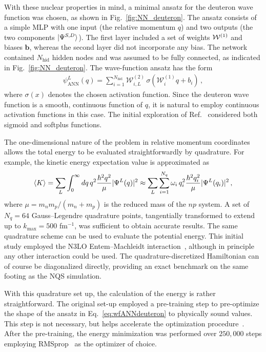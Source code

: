 With these nuclear properties in mind, a minimal ansatz for the deuteron wave function was chosen, as shown in Fig.~\ref{fig:NN_deuteron}. The ansatz consists of a simple MLP with one input (the relative momentum $q$) and two outputs (the two components $\ket{\Psi^{S,D}}$). The first layer included a set of weights ${\bf \mathcal{W}}^{(1)}$ and biases $\mathbf{b}$, whereas the second layer did not incorporate any bias. The network contained $N_\text{hid}$ hidden nodes and was assumed to be fully connected, as indicated in Fig.~\ref{fig:NN_deuteron}. The wave-function ansatz has the form
\begin{align}
    \psi_{\textrm{ANN}}^L (q) =  \sum_{i=1}^{N_\text{hid}} \mathcal{W}^{(2)}_{i,L} \, \sigma \left( \mathcal{W}^{(1)}_{i} q + b_{i} \right) \, ,
    \label{eq:wfANNdeuteron}
\end{align}
where $\sigma(x)$ denotes the chosen activation function. Since the deuteron wave function is a smooth, continuous function of $q$, it is natural to employ continuous activation functions in this case. The initial exploration of Ref.~\cite{keeble_machine_2020} considered both sigmoid and softplus functions.
 


The one-dimensional nature of the problem in relative momentum coordinates allows the total energy to be evaluated straightforwardly by quadrature. For example, the kinetic energy expectation value is approximated as
\begin{align}
    \braket{K} = \sum_L 
    \int_0^\infty dq \, q^2 
    \frac{\hbar^2 q^2}{\mu} | \Psi^L(q) |^2
    \approx 
    \sum_L \sum_{i=1}^{N_q} \omega_i \, q_i^2 
    \frac{\hbar^2 q_i^2}{\mu} | \Psi^L(q_i) |^2 \, ,
    \label{eq:kinetic}
\end{align}
where $\mu = m_n m_p /(m_n + m_p)$ is the reduced mass of the $np$ system. 
A set of $N_q = 64$ Gauss--Legendre quadrature points, tangentially transformed to extend up to $k_\textrm{max} = 500$ fm$^{-1}$, was sufficient to obtain accurate results. The same quadrature scheme can be used to evaluate the potential energy.
This initial study employed the N3LO Entem--Machleidt interaction~\cite{Entem2003}, although in principle any other interaction could be used. The quadrature-discretized Hamiltonian can of course be diagonalized directly, providing an exact benchmark on the same footing as the NQS simulation.

With this quadrature set up, the calculation of the energy is rather straightforward. The original set-up employed a pre-training step to pre-optimize the shape of the ansatz in Eq.~\eqref{eq:wfANNdeuteron} to physically sound values. This step is not necessary, but helps accelerate the optimization procedure~\cite{rozalen_sarmiento_machine_2024}. 
After the pre-training, the energy minimization was performed over $250,000$ steps employing RMSprop~\cite{hinton_lecture_2012} as the optimizer of choice. 

